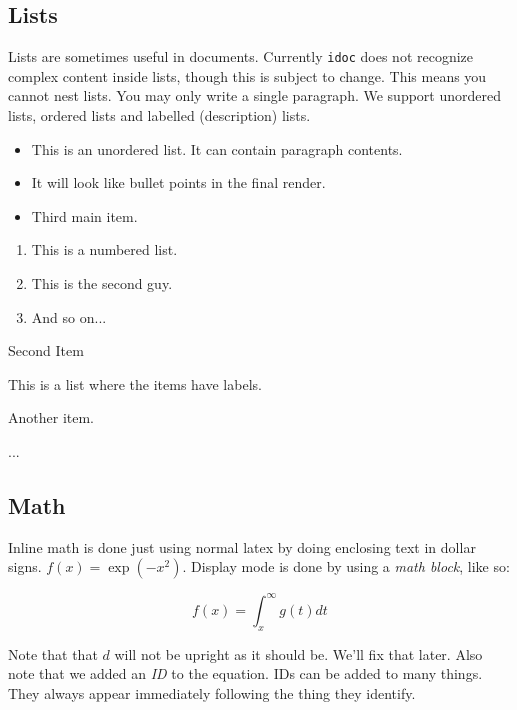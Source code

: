 \documentclass[mpinclude=true]{scrartcl}
\begin{document}
\subsection{Lists}


Lists are sometimes useful in documents.  Currently \texttt{idoc} does not
recognize complex content inside lists, though this is subject to
change.  This means you cannot nest lists.  You may only write a
single paragraph.  We support unordered lists, ordered lists and
labelled (description) lists.

\begin{itemize}
\item This is an unordered list.  It can contain paragraph contents.
\item It will look like bullet points in the final render.
\item Third main item.
\end{itemize}

\begin{enumerate}
\item This is a numbered list.
\item This is the second guy.
\item And so on...
\end{enumerate}

\begin{labeling}
{Second Item}\item[First Item] This is a list where the items have labels.
\item[Second Item] Another item.
\item[And So On] ...
\end{labeling}

\subsection{Math}


Inline math is done just using normal latex by doing enclosing text in
dollar signs. $f(x) = \exp (-x^2)$.  Display mode is done by using a
\emph{math block}, like so:

\begin{displaymath}
\label{\#eqn:f-defn} f(x) = \int_x^\infty g(t) dt
\end{displaymath}

Note that that $d$ will not be upright as it should be.  We'll fix
that later.  Also note that we added an \emph{ID} to the equation.  IDs can
be added to many things.  They always appear immediately following the
thing they identify.
\end{document}
